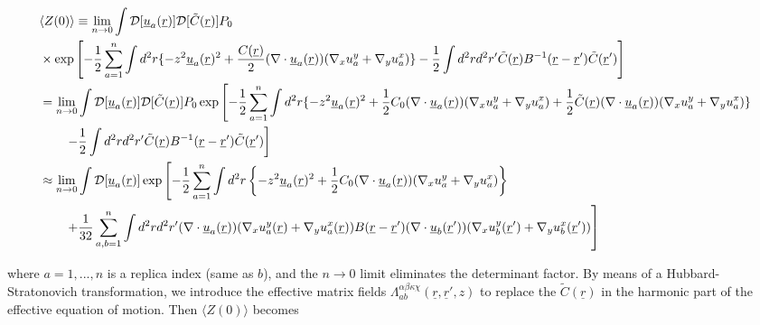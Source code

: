 \documentclass[twoside,twocolumn,9pt]{article}
\begin{document}
\begin{strip}
\begin{align}
&\langle Z(0)\rangle\equiv\lim_{n\rightarrow0}\int\mathcal{D}[\underline{u}_a(\underline{r})]\mathcal{D}[\tilde{C}(\underline{r})]P_0\notag\\
&\times\exp\left[-\frac{1}{2}\sum_{a=1}^n\int d^2r\{-z^2\underline{u}_a(\underline{r})^2+\frac{C(\underline{r})}{2}(\nabla\cdot\underline{u}_a(\underline{r}))(\nabla_xu^y_a+\nabla_yu^x_a)\}-\frac{1}{2}\int d^2rd^2r'\tilde{C}(\underline{r})B^{-1}(\underline{r}-\underline{r}')\tilde{C}(\underline{r}')\right]\notag\\
&=\lim_{n\rightarrow0}\int\mathcal{D}[\underline{u}_a(\underline{r})]\mathcal{D}[\tilde{C}(\underline{r})]P_0\exp\left[-\frac{1}{2}\sum_{a=1}^n\int d^2r\{{-z^2\underline{u}_a(\underline{r})^2+\frac{1}{2}C_0(\nabla\cdot\underline{u}_a(\underline{r}))(\nabla_xu^y_a+\nabla_yu^x_a)+\frac{1}{2}\tilde{C}(\underline{r})(\nabla\cdot\underline{u}_a(\underline{r}))(\nabla_xu^y_a+\nabla_yu^x_a)\}}\right.\notag\\
&\qquad\left.{-\frac{1}{2}\int d^2rd^2r'\tilde{C}(\underline{r})B^{-1}(\underline{r}-\underline{r}')\tilde{C}(\underline{r}')}\right]\notag\\
&\approx\lim_{n\rightarrow0}\int\mathcal{D}[\underline{u}_a(\underline{r})]\exp\left[{-\frac{1}{2}\sum_{a=1}^n\int d^2r\left\{-z^2\underline{u}_a(\underline{r})^2+\frac{1}{2}C_0(\nabla\cdot\underline{u}_a(\underline{r}))(\nabla_xu^y_a+\nabla_yu^x_a)\right\}}\right.\notag\\
&\qquad\left.{+\frac{1}{32}\sum_{a,b=1}^n\int d^2rd^2r'(\nabla\cdot\underline{u}_a(\underline{r}))(\nabla_xu^y_a(\underline{r})+\nabla_yu^x_a(\underline{r}))B(\underline{r}-\underline{r}')(\nabla\cdot\underline{u}_b(\underline{r}'))(\nabla_xu^y_b(\underline{r}')+\nabla_yu^x_b(\underline{r}'))}\right]
\end{align}
\end{strip}
where $a=1,...,n$ is a replica index (same as $b$), and the $n\rightarrow0$ limit eliminates the determinant factor. By means of a Hubbard-Stratonovich transformation, we introduce the effective matrix fields $\Lambda^{\alpha\beta\kappa\chi}_{ab}(\underline{r},\underline{r}',z)$ to replace the $\tilde{C}(\underline{r})$ in the harmonic part of the effective equation of motion. Then $\langle Z(0)\rangle$ becomes
\end{document}

